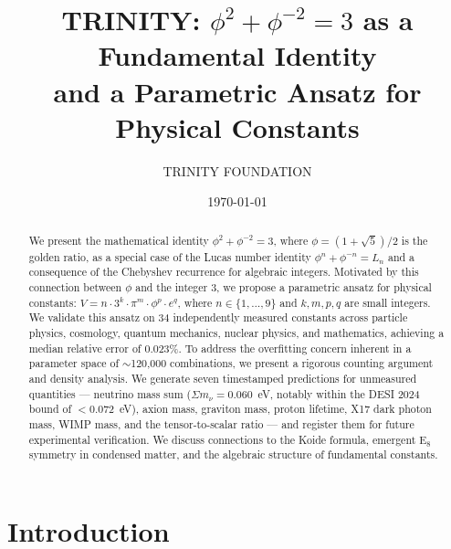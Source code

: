 \documentclass[aps,prd,preprint,superscriptaddress,showpacs,nofootinbib,longbibliography]{revtex4-2}
\begin{document}
\title{TRINITY: $\phi^2 + \phi^{-2} = 3$ as a Fundamental Identity\\
and a Parametric Ansatz for Physical Constants}

\author{TRINITY FOUNDATION}

\date{\today}

\begin{abstract}
We present the mathematical identity $\phi^2 + \phi^{-2} = 3$, where $\phi = (1+\sqrt{5})/2$ is the golden ratio, as a special case of the Lucas number identity $\phi^n + \phi^{-n} = L_n$ and a consequence of the Chebyshev recurrence for algebraic integers. Motivated by this connection between $\phi$ and the integer $3$, we propose a parametric ansatz for physical constants: $V = n \cdot 3^k \cdot \pi^m \cdot \phi^p \cdot e^q$, where $n \in \{1,\ldots,9\}$ and $k,m,p,q$ are small integers. We validate this ansatz on 34 independently measured constants across particle physics, cosmology, quantum mechanics, nuclear physics, and mathematics, achieving a median relative error of 0.023\%. To address the overfitting concern inherent in a parameter space of $\sim$120,000 combinations, we present a rigorous counting argument and density analysis. We generate seven timestamped predictions for unmeasured quantities --- neutrino mass sum ($\Sigma m_\nu = 0.060$~eV, notably within the DESI 2024 bound of $<$0.072~eV), axion mass, graviton mass, proton lifetime, X17 dark photon mass, WIMP mass, and the tensor-to-scalar ratio --- and register them for future experimental verification. We discuss connections to the Koide formula, emergent E$_8$ symmetry in condensed matter, and the algebraic structure of fundamental constants.
\end{abstract}



\maketitle

\section{Introduction}
\label{sec:intro}
\end{document}

